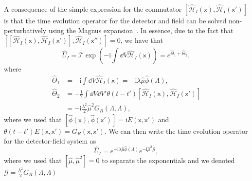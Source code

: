\documentclass[letterpaper,12pt,titlepage,oneside,final]{book}
\newcommand{\mf}{\mathsf}%
\newcommand{\ii}{\mathrm{i}}
\begin{document}
A consequence of the simple expression for the commutator $[\hat{\mathcal{H}}_I(\mf x), \hat{\mathcal{H}}_I(\mf x')]$ is that the time evolution operator for the detector and field can be solved non-perturbatively using the Magnus expansion~\cite{magnus}. In essence, due to the fact that $[[\hat{\mathcal{H}}_I(\mf x), \hat{\mathcal{H}}_I(\mf x')],\hat{\mathcal{H}}_I(\mf x'')] = 0$, we have that~\cite{magnus}
\begin{equation}
    \hat{U}_I = \mathcal{T}\exp\left(- \ii \int \dd V \hat{\mathcal{H}}_I(\mf x)\right) = e^{\hat{\Theta}_1+\hat{\Theta}_2},
\end{equation}
where
\begin{align}
    \hat{\Theta}_1 &= - \ii \int \dd V \hat{\mathcal{H}}_I(\mf x) = - \ii \lambda \hat{\mu} \hat{\phi}(\Lambda),\\
    \hat{\Theta}_2 &= - \frac{1}{2} \int \dd V \dd V' \theta(t-t')[\hat{\mathcal{H}}_I(\mf x), \hat{\mathcal{H}}_I(\mf x')] \\&= -  \ii \frac{\lambda^2}{2} \hat{\mu}^2G_R(\Lambda,\Lambda),
\end{align}
where we used that $[\hat{\phi}(\mf x), \hat{\phi}(\mf x')] = \ii E(\mf x,\mf x')$ and $\theta(t-t')E(\mf x, \mf x') = G_R(\mf x,\mf x')$. We can then write the time evolution operator for the detector-field system as
\begin{equation}
    \hat{U}_I = e^{- \ii \lambda \hat{\mu} \hat{\phi}(\Lambda)}e^{- \ii \hat{\mu}^2 \mathcal{G}},
\end{equation}
where we used that $[\hat{\mu},\hat{\mu}^2] = 0$ to separate the exponentials and we denoted $\mathcal{G} = \frac{\lambda^2}{2} G_R(\Lambda,\Lambda)$ 
\end{document}
